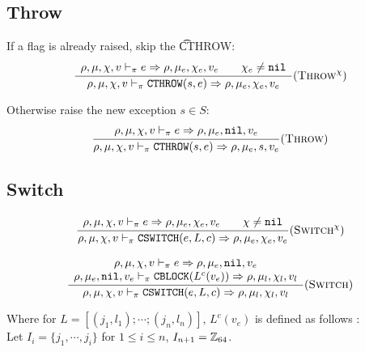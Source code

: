 \subsection{Throw}
If a flag is already raised, skip the \t{CTHROW}:
\[\dfrac{\begin{array}{c}
    \rho,\mu,\chi,v \vdash_\pi e \Rightarrow \rho,\mu_e,\chi_e,v_e \qquad \chi_e\ne\texttt{nil}
\end{array}}{\rho,\mu,\chi,v \vdash_\pi \texttt{CTHROW}(s,e) \Rightarrow \rho,\mu_e,\chi_e,v_e} (\textsc{Throw}^\chi)\]

Otherwise raise the new exception \(s\in S\):
\[\dfrac{\begin{array}{c}
    \rho,\mu,\chi,v \vdash_\pi e \Rightarrow \rho,\mu_e,\texttt{nil},v_e
\end{array}}{\rho,\mu,\chi,v \vdash_\pi \texttt{CTHROW}(s,e) \Rightarrow \rho,\mu_e,s,v_e} (\textsc{Throw})\]

\subsection{Switch}

\[\dfrac{\begin{array}{c}
    \rho,\mu,\chi,v \vdash_\pi e \Rightarrow \rho,\mu_e,\chi_e,v_e \qquad \chi\ne\texttt{nil}
\end{array}}{\rho,\mu,\chi,v \vdash_\pi \texttt{CSWITCH}(e, L, c) \Rightarrow \rho,\mu_e,\chi_e,v_e} (\textsc{Switch}^\chi)\]

\[\dfrac{\begin{array}{c}
    \rho,\mu,\chi,v \vdash_\pi e \Rightarrow \rho,\mu_e,\texttt{nil},v_e \\
    \rho,\mu_e,\texttt{nil},v_e \vdash_\pi \texttt{CBLOCK}(L^c(v_e)) \Rightarrow \rho,\mu_l,\chi_l,v_l
\end{array}}{\rho,\mu,\chi,v \vdash_\pi \texttt{CSWITCH}(e, L, c) \Rightarrow \rho,\mu_l,\chi_l,v_l} (\textsc{Switch})\]

Where for \(L = [(j_1, l_1); \cdots; (j_n,l_n)]\), \(L^c(v_e)\) is defined as follows : \\
Let \(I_i =  \{ j_1, \cdots, j_i \}\) for \(1 \leq i \leq n\), \(I_{n+1} = \mathbb{Z}_{64}\). \\


